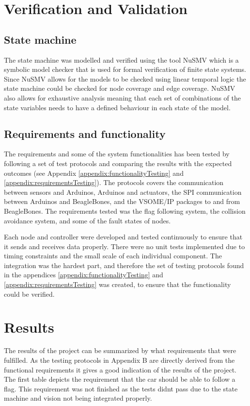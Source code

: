 \documentclass[11pt, titlepage]{article} %
\begin{document}
\clearpage
\section{Verification and Validation}

\subsection{State machine}
The state machine was modelled and verified using the tool NuSMV which is a symbolic model checker that is used for formal verification of finite state systems. Since NuSMV allows for the models to be checked using linear temporal logic the state machine could be checked for node coverage and edge coverage. NuSMV also allows for exhaustive analysis meaning that each set of combinations of the state variables needs to have a defined behaviour in each state of the model.

\subsection{Requirements and functionality}
The requirements and some of the system functionalities has been tested by following a set of test protocols and comparing the results with the expected outcomes (see Appendix \ref{appendix:functionalityTesting} and \ref{appendix:requirementsTesting}). The protocols covers the communication between sensors and Arduinos, Arduinos and actuators, the SPI communication between Arduinos and BeagleBones, and the VSOME/IP packages to and from BeagleBones. The requirements tested was the flag following system, the collision avoidance system, and some of the fault states of nodes.

Each node and controller were developed and tested continuously to ensure that it sends and receives data properly. There were no unit tests implemented due to timing constraints and the small scale of each individual component. The integration was the hardest part, and therefore the set of testing protocols found in the appendices \ref{appendix:functionalityTesting} and \ref{appendix:requirementsTesting} was created, to ensure that the functionality could be verified.  

\clearpage
\section{Results}
The results of the project can be summarized by what requirements that were fulfilled. As the testing protocols in Appendix B are directly derived from the functional requirements it gives a good indication of the results of the project. The first table depicts the requirement that the car should be able to follow a flag. This requirement was not finished as the tests didnt pass due to the state machine and vision not being integrated properly.
\end{document}
